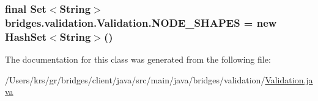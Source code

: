 \subsubsection[{N\+O\+D\+E\+\_\+\+S\+H\+A\+P\+E\+S}]{\setlength{\rightskip}{0pt plus 5cm}final Set$<$String$>$ bridges.\+validation.\+Validation.\+N\+O\+D\+E\+\_\+\+S\+H\+A\+P\+E\+S = new Hash\+Set$<$String$>$()\hspace{0.3cm}{\ttfamily [static]}}\label{classbridges_1_1validation_1_1_validation_a43f1f9efc20d0086b7fcfa9b40bd7146}


The documentation for this class was generated from the following file\+:\begin{DoxyCompactItemize}
\item 
/\+Users/krs/gr/bridges/client/java/src/main/java/bridges/validation/\hyperlink{_validation_8java}{Validation.\+java}\end{DoxyCompactItemize}
